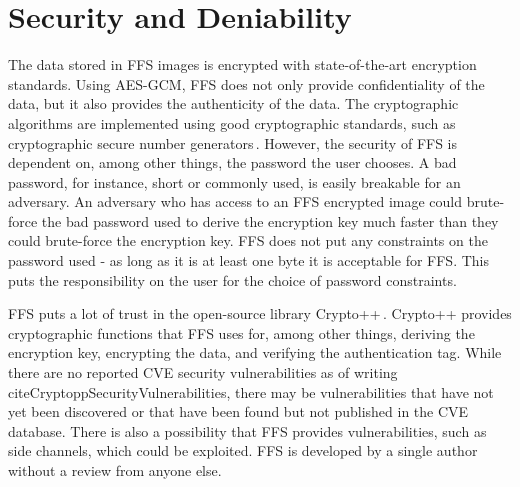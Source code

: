 \section{Security and Deniability}
The data stored in \gls{FFS} images is encrypted with state-of-the-art encryption standards. Using \gls{AES}-\gls{GCM}, \gls{FFS} does not only provide confidentiality of the data, but it also provides the authenticity of the data. The cryptographic algorithms are implemented using good cryptographic standards, such as cryptographic secure number generators\,\cite{RandomNumberGeneratorCryptoWiki2021}. However, the security of \gls{FFS} is dependent on, among other things, the password the user chooses. A bad password, for instance, short or commonly used, is easily breakable for an adversary. An adversary who has access to an \gls{FFS} encrypted image could brute-force the bad password used to derive the encryption key much faster than they could brute-force the encryption key. \gls{FFS} does not put any constraints on the password used - as long as it is at least one byte it is acceptable for \gls{FFS}. This puts the responsibility on the user for the choice of password constraints. 

\gls{FFS} puts a lot of trust in the open-source library Crypto++\,\cite{CryptoLibraryFree}. Crypto++ provides cryptographic functions that \gls{FFS} uses for, among other things, deriving the encryption key, encrypting the data, and verifying the authentication tag. While there are no reported CVE security vulnerabilities as of writing\,cite{CryptoppSecurityVulnerabilities}, there may be vulnerabilities that have not yet been discovered or that have been found but not published in the CVE database. There is also a possibility that \gls{FFS} provides vulnerabilities, such as side channels, which could be exploited. \gls{FFS} is developed by a single author without a review from anyone else.

